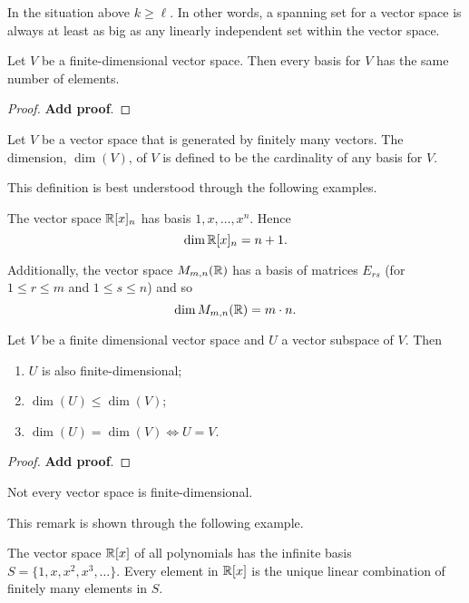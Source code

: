 \documentclass[10pt, a4paper]{article}
\begin{document}
\begin{corollary}
    In the situation above $k \geq \ell$.
    In other words,
    a spanning set for a vector space is always at least as big as any linearly independent set within the vector space.
\end{corollary}

\begin{corollary}
    Let $V$ be a finite-dimensional vector space.
    Then every basis for $V$ has the same number of elements.
    \begin{proof}
        \textbf{Add proof}.
    \end{proof}
\end{corollary}

\begin{definition}[Dimension]
    Let $V$ be a vector space that is generated by finitely many vectors.
    The dimension,
    $\dim{(V)}$,
    of $V$ is defined to be the cardinality of any basis for $V$.
\end{definition}
This definition is best understood through the following examples.
\begin{example}
    The vector space $\mathbb{R}[x]_n$ has basis $1, x, \dotsc, x ^ n$.
    Hence
    \[
    \dim{\mathbb{R}[x]_n} = n + 1.
    \]

    Additionally,
    the vector space $M_{m, n}(\mathbb{R})$ has a basis of matrices $E_{rs}$
    (for $1 \leq r \leq m$ and $1 \leq s \leq n$)
    and so
    \[
    \dim{M_{m, n}(\mathbb{R})} = m \cdot n.
    \]
\end{example}

\begin{theorem}\label{pre_linalg_thm_finitedimensionalvecspacegivesdimresults}
    Let $V$ be a finite dimensional vector space and $U$ a vector subspace of $V$.
    Then
    \begin{enumerate}[label = (\roman*)]
        \item $U$ is also finite-dimensional;
        \item $\dim{(U)} \leq \dim{(V)}$;
        \item $\dim{(U)} = \dim{(V)} \iff U = V$.
    \end{enumerate}
    \begin{proof}
        \textbf{Add proof}.
    \end{proof}
\end{theorem}

\begin{remark}
    Not every vector space is finite-dimensional.
\end{remark}
This remark is shown through the following example.
\begin{example}
    The vector space $\mathbb{R}[x]$ of all polynomials has the infinite basis $S = \{1, x, x ^ 2, x ^ 3, \dotsc\}$.
    Every element in $\mathbb{R}[x]$ is the unique linear combination of finitely many elements in $S$.
\end{example}
\end{document}

